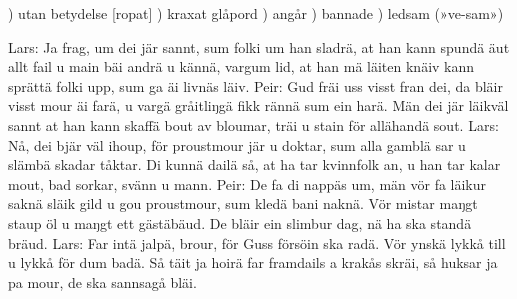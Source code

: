 \vspace{12mm}
\tabto{0.2cm}) \tabto{0.7cm}utan betydelse [ropat]
\tabto{0.2cm}) \tabto{0.7cm}kraxat glåpord
\tabto{0.2cm}) \tabto{0.7cm}angår
\tabto{0.2cm}) \tabto{0.7cm}bannade
\tabto{0.2cm}) \tabto{0.7cm}ledsam (»ve-sam»)
\newpage
\begin{multicols}{2}
Lars: Ja frag, um dei jär sannt,
      sum folki um han sladrä,
      at han kann spundä äut
      allt fail u main bäi andrä
      u kännä, vargum lid,
      at han mä läiten knäiv
      kann sprättä folki upp,
      sum ga äi livnäs läiv.
Peir: Gud fräi uss visst fran dei,
      da bläir visst mour äi farä,
      u vargä gråitliŋgä
      fikk rännä sum ein harä.
      Män dei jär läikväl sannt
      at han kann skaffä bout
      av bloumar, träi u stain
      för allähandä sout.
Lars: Nå, dei bjär väl ihoup,
      för proustmour jär u doktar,
      sum alla gamblä sar
      u slämbä skadar tåktar.
      Di kunnä dailä så,
      at ha tar kvinnfolk an,
      u han tar kalar mout,
      bad sorkar, svänn u mann.
\vfill\columnbreak
Peir: De fa di nappäs um,
      män vör fa läikur saknä
      släik gild u gou proustmour,
      sum kledä bani naknä.
      Vör mistar maŋgt staup öl
      u maŋgt ett gästäbäud.
      De bläir ein slimbur dag,
      nä ha ska standä bräud.
Lars: Far intä jalpä, brour,
      för Guss försöin ska radä.
      Vör ynskä lykkå till
      u lykkå för dum badä.
      Så täit ja hoirä far
      framdails a krakås skräi,
      så huksar ja pa mour,
      de ska sannsagå bläi.
\end{multicols}

